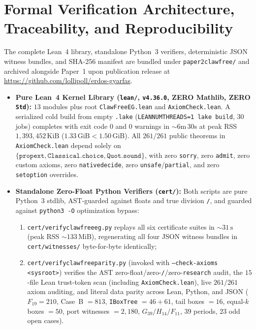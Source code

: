 \documentclass[11pt,reqno]{amsart}
\theoremstyle{plain}
\theoremstyle{definition}
\theoremstyle{remark}
\DeclareRobustCommand{\_}{\ifmmode\text{\textunderscore}\else\textunderscore\allowbreak\fi}
\begin{document}
\section{Formal Verification Architecture, Traceability, and Reproducibility}\label{sec:verification}

The complete Lean~4 library, standalone Python~3 verifiers, deterministic JSON witness bundles, and SHA-256 manifest are bundled under \texttt{paper2\_clawfree/} and archived alongside Paper~1 upon publication release at \url{https://github.com/lollipoll/erdos-gyarfas}.

\begin{itemize}[leftmargin=1.8em]
  \item \textbf{Pure Lean~4 Kernel Library (\texttt{lean/}, \texttt{v4.36.0}, ZERO Mathlib, ZERO \texttt{Std}):} $13$ modules plus root \texttt{ClawFreeEG.lean} and \texttt{AxiomCheck.lean}. A serialized cold build from empty \texttt{.lake} (\texttt{LEAN\_NUM\_THREADS=1 lake build}, $30$ jobs) completes with exit code $0$ and $0$ warnings in ${\sim}6\text{m}\,30\text{s}$ at peak RSS $1{,}393{,}452\,\mathrm{KiB}$ ($1.33\,\mathrm{GiB} < 1.50\,\mathrm{GiB}$). All $261/261$ public theorems in \texttt{AxiomCheck.lean} depend solely on $\{\texttt{propext}, \texttt{Classical.choice}, \texttt{Quot.sound}\}$, with zero \texttt{sorry}, zero \texttt{admit}, zero custom axioms, zero \texttt{native\_decide}, zero \texttt{unsafe}/\texttt{partial}, and zero \texttt{set\_option} overrides.
  \item \textbf{Standalone Zero-Float Python Verifiers (\texttt{cert/}):} Both scripts are pure Python~3 stdlib, AST-guarded against floats and true division \texttt{/}, and guarded against \texttt{python3 -O} optimization bypass:
  \begin{enumerate}[label=(\alph*),leftmargin=2em]
    \item \texttt{cert/verify\_clawfree\_eg.py} replays all six certificate suites in ${\sim}31\,\mathrm{s}$ (peak RSS ${\sim}133\,\mathrm{MiB}$), regenerating all four JSON witness bundles in \texttt{cert/witnesses/} byte-for-byte identically;
    \item \texttt{cert/verify\_clawfree\_parity.py} (invoked with \texttt{--check-axioms <sysroot>}) verifies the AST zero-float/zero-\texttt{/}/zero-\texttt{research} audit, the $15$-file Lean trust-token scan (including \texttt{AxiomCheck.lean}), live $261/261$ axiom auditing, and literal data parity across Lean, Python, and JSON ($F_{19} = 210$, Case~B $= 813$, \texttt{IBoxTree} $= 46 + 61$, tail boxes $= 16$, equal-$k$ boxes $= 50$, port witnesses $= 2{,}180$, $G_{39}/H_{14}/F_{11}$, $39$ periods, $23$ odd open cases).
  \end{enumerate}
\end{itemize}
\end{document}
